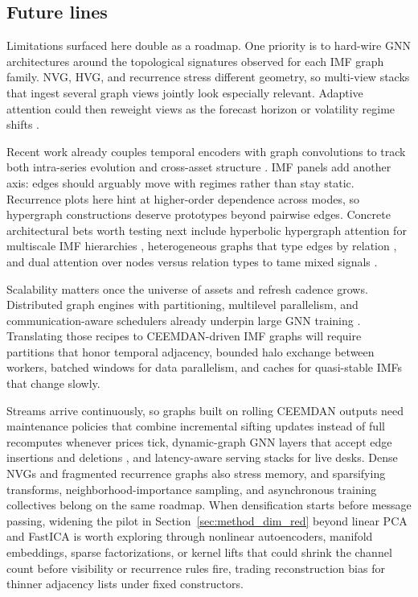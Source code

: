 \documentclass[11pt,a4paper]{article}
\begin{document}
\subsection{Future lines}
Limitations surfaced here double as a roadmap. One priority is to hard-wire GNN architectures around the topological signatures observed for each IMF graph family. NVG, HVG, and recurrence stress different geometry, so multi-view stacks that ingest several graph views jointly \citep{liu2023multimodal, wang2023hatr} look especially relevant. Adaptive attention could then reweight views as the forecast horizon or volatility regime shifts \citep{su2024attention}.

Recent work already couples temporal encoders with graph convolutions to track both intra-series evolution and cross-asset structure \citep{liu2023multimodal, wang2023hatr, jin2023temporal}. IMF panels add another axis: edges should arguably move with regimes rather than stay static. Recurrence plots here hint at higher-order dependence across modes, so hypergraph constructions \citep{su2024attention, agarwal2022think} deserve prototypes beyond pairwise edges. Concrete architectural bets worth testing next include hyperbolic hypergraph attention for multiscale IMF hierarchies \citep{agarwal2022think}, heterogeneous graphs that type edges by relation \citep{jin2023temporal}, and dual attention over nodes versus relation types to tame mixed signals \citep{wang2023hatr}.

Scalability matters once the universe of assets and refresh cadence grows. Distributed graph engines with partitioning, multilevel parallelism, and communication-aware schedulers already underpin large GNN training \citep{xu2025capturing}. Translating those recipes to CEEMDAN-driven IMF graphs will require partitions that honor temporal adjacency, bounded halo exchange between workers, batched windows for data parallelism, and caches for quasi-stable IMFs that change slowly.

Streams arrive continuously, so graphs built on rolling CEEMDAN outputs need maintenance policies that combine incremental sifting updates instead of full recomputes whenever prices tick, dynamic-graph GNN layers that accept edge insertions and deletions \citep{gravina2023scalable, liu2023decoupled}, and latency-aware serving stacks for live desks. Dense NVGs and fragmented recurrence graphs also stress memory, and sparsifying transforms, neighborhood-importance sampling, and asynchronous training collectives belong on the same roadmap. When densification starts before message passing, widening the pilot in Section~\ref{sec:method_dim_red} beyond linear PCA and FastICA is worth exploring through nonlinear autoencoders, manifold embeddings, sparse factorizations, or kernel lifts that could shrink the channel count before visibility or recurrence rules fire, trading reconstruction bias for thinner adjacency lists under fixed constructors.
\end{document}

